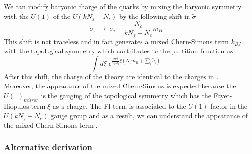 We can modify baryonic charge of the quarks by mixing the baryonic symmetry with the $U(1)$ of the $U(k N_f - N_c)$ by the following shift in $\tilde{\sigma}$
\begin{equation}
 \tilde{\sigma}_i \; \longrightarrow \; \tilde{\sigma}_i - \frac{N_c}{k N_f - N_c} m_B
\end{equation}
This shift is not traceless and in fact generates a mixed Chern-Simons term $k_{BJ}$ with the topological symmetry which contributes to the partition function as
\begin{equation}
\int d \xi \; e^{\frac{2 \pi i }{\omega_1 \omega_2}  \xi \left(   N_c m_B  + \sum_i \tilde{\sigma}_i \right)}
\end{equation}
After this shift, the charge of the theory are identical to the charges in \cite{Nii:2014jsa}. 
Moreover, the appearance of the mixed Chern-Simons is expected because the $U(1)_{mirror}$ is the gauging of the topological symmetry which has the Fayet-Iliopulos term $\xi$ as a charge.
The FI-term is associated to the $U(1)$ factor in the $U(k N_f - N_c)$ gauge group and as a result, we can understand the appearance of the mixed Chern-Simons term \cite{Nii:2014jsa}.

\subsubsection{Alternative derivation}

